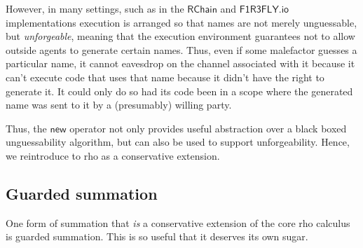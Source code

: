 However, in many settings, such as in the $\mathsf{RChain}$ and
$\mathsf{F1R3FLY.io}$ implementations execution is arranged so that
names are not merely unguessable, but \emph{unforgeable}, meaning that
the execution environment guarantees not to allow outside agents to
generate certain names. Thus, even if some malefactor guesses a
particular name, it cannot eavesdrop on the channel associated with it
because it can't execute code that uses that name because it didn't
have the right to generate it. It could only do so had its code been
in a scope where the generated name was sent to it by a (presumably)
willing party.

Thus, the $\mathsf{new}$ operator not only provides useful abstraction
over a black boxed unguessability algorithm, but can also be used to
support unforgeability. Hence, we reintroduce to rho as a conservative
extension.


\subsection{Guarded summation}

One form of summation that \emph{is} a conservative extension of the
core rho calculus is guarded summation. This is so useful that it
deserves its own sugar.

